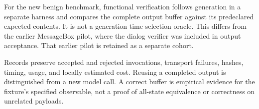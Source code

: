 For the new benign benchmark, functional verification follows
generation in a separate harness and compares the complete output
buffer against its predeclared expected contents. It is not a
generation-time selection oracle. This differs from the earlier
MessageBox pilot, where the dialog verifier was included in output
acceptance. That earlier pilot is retained as a separate cohort.

Records preserve accepted and rejected invocations, transport failures,
hashes, timing, usage, and locally estimated cost. Reusing a completed
output is distinguished from a new model call. A correct buffer is
empirical evidence for the fixture's specified observable, not a
proof of all-state equivalence or correctness on unrelated payloads.
